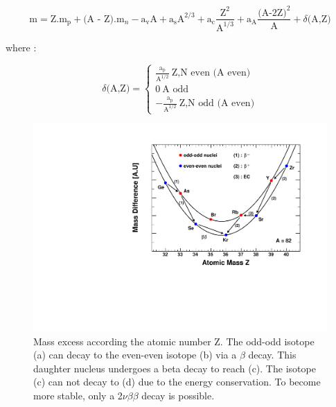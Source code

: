 \documentclass[main.tex]{subfiles}
\begin{document}
\begin{equation}
\text{m} = \text{Z}.\text{m}_\text{p} + \text{(A - Z)}.\text{m}_{n} - \text{a}_\text{v} \text{A} + \text{a}_\text{s} \text{A}^{\text{2/3}} +  \text{a}_\text{c} \frac{\text{Z}^\text{2}}{\text{A}^{\text{1/3}}} +  \text{a}_\text{A} \frac{\text{(A-2Z)}^\text{2}}{\text{A}} + \delta \text{(A,Z)} 
\end{equation}

\NI where :


\begin{equation}
\delta \text{(A,Z)} = 
\left\{
\begin{array}{l}
  \frac{\text{a}_\text{p}}{\text{A}^{\text{1/2}}}~\text{Z,N~even~(A even)} \\[0.5cm]
  \text{0}~\text{A~odd}\\[0.5cm]
  -\frac{\text{a}_\text{p}}{\text{A}^{\text{1/2}}}~\text{Z,N~odd~(A even)} 
\end{array}
\right.
\end{equation}


\begin{figure}[h!]
\begin{center}
\includegraphics[scale=0.6]{pictures/Chap2/WeizsackerParabola_v3.pdf}
\caption{Mass excess according the atomic number Z. The odd-odd isotope (a) can decay to the even-even isotope (b) via a $\beta$ decay. This daughter nucleus undergoes a beta decay to reach (c). The isotope (c) can not decay to (d) due to the energy conservation. To become more stable, only a 2$\nu\beta\beta$ decay is possible.}
\label{WeizsackerParabola}
\end{center}
\end{figure}
\end{document}
